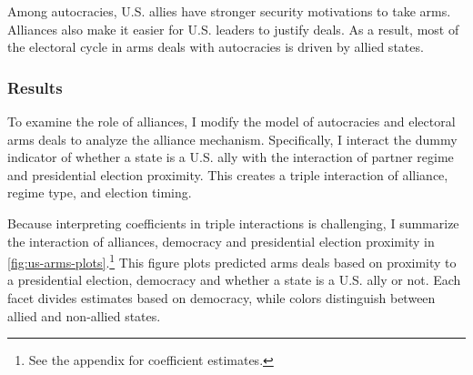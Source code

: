\documentclass[12pt]{article}
\begin{document}


Among autocracies, U.S. allies have stronger security motivations to take arms. 
Alliances also make it easier for U.S. leaders to justify deals.
As a result, most of the electoral cycle in arms deals with autocracies is driven by allied states. 
 

 
\subsubsection{Results}

To examine the role of alliances, I modify the model of autocracies and electoral arms deals to analyze the alliance mechanism.
Specifically, I interact the dummy indicator of whether a state is a U.S. ally with the interaction of partner regime and presidential election proximity. 
This creates a triple interaction of alliance, regime type, and election timing. 


Because interpreting coefficients in triple interactions is challenging, I summarize the interaction of alliances, democracy and presidential election proximity in \autoref{fig:us-arms-plots}.\footnote{See the appendix for coefficient estimates.}
This figure plots predicted arms deals based on proximity to a presidential election, democracy and whether a state is a U.S. ally or not. 
Each facet divides estimates based on democracy, while colors distinguish between allied and non-allied states. 
\end{document}
